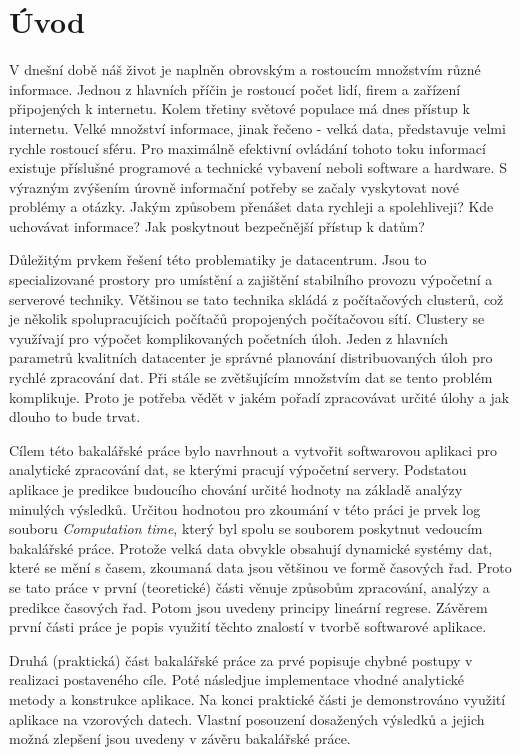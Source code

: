 \documentclass[a4paper,12pt,twoside]{scrreprt}
\begin{document}
\chapter*{Úvod}

V dnešní době náš život je naplněn obrovským a rostoucím množstvím různé informace. Jednou z hlavních příčin je rostoucí počet lidí, firem a zařízení připojených k internetu. Kolem třetiny světové populace má dnes přístup k internetu. Velké množství informace, jinak řečeno - velká data, představuje velmi rychle rostoucí sféru. Pro maximálně efektivní ovládání tohoto toku informací existuje příslušné programové a technické vybavení neboli software a hardware. S výrazným zvýšením úrovně informační potřeby se začaly vyskytovat nové problémy a otázky. Jakým způsobem přenášet data rychleji a spolehliveji? Kde uchovávat informace? Jak poskytnout bezpečnější přístup k datům?

Důležitým prvkem řešení této problematiky je datacentrum. Jsou to specializované prostory pro umístění a zajištění stabilního provozu výpočetní a serverové techniky. Většinou se tato technika skládá z počítačových clusterů, což je několik spolupracujícich počítačů propojených počítačovou sítí. Clustery se využívají pro výpočet komplikovaných početních úloh. Jeden z hlavních parametrů kvalitních datacenter je správné planování distribuovaných úloh pro rychlé zpracování dat. Při stále se zvětšujícím množstvím dat se tento problém komplikuje. Proto je potřeba vědět v jakém pořadí zpracovávat určité úlohy a jak dlouho to bude trvat. 

Cílem této bakalářské práce bylo navrhnout a vytvořit softwarovou aplikaci pro analytické zpracování dat, se kterými pracují výpočetní servery. Podstatou aplikace je predikce budoucího chování určité hodnoty na základě analýzy minulých výsledků. Určitou hodnotou pro zkoumání v této práci je prvek log souboru \textit{Computation time}, který byl spolu se souborem poskytnut vedoucím bakalářské práce. Protože velká data obvykle obsahují dynamické systémy dat, které se mění s časem, zkoumaná data jsou většinou ve formě časových řad. Proto se tato práce v první (teoretické) části věnuje způsobům zpracování, analýzy a predikce časových řad. Potom jsou uvedeny principy lineární regrese. Závěrem první části práce je popis využití těchto znalostí v tvorbě softwarové aplikace. 

Druhá (praktická) část bakalářské práce za prvé popisuje chybné postupy v realizaci postaveného cíle. Poté následjue implementace vhodné analytické metody a konstrukce aplikace. Na konci praktické části je demonstrováno využití aplikace na vzorových datech. Vlastní posouzení dosažených výsledků a jejich možná zlepšení jsou uvedeny v závěru bakalářské práce.
\end{document}
